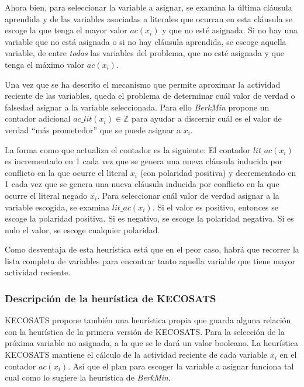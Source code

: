\documentclass[12pt,lettersize,oneside]{article}
\begin{document}
Ahora bien, para seleccionar la variable a asignar, se examina la última
cláusula aprendida y de las variables asociadas a literales que ocurran en esta
cláusula se escoge la que tenga el mayor valor $ac(x_i)$ y que no esté
asignada. Si no hay una variable que no está asignada o si no hay cláusula
aprendida, se escoge aquella variable, de entre \emph{todas} las variables del
problema, que no esté asignada y que tenga el máximo valor $ac(x_i)$.

Una vez que se ha descrito el mecanismo que permite aproximar la actividad
reciente de las variables, queda el problema de determinar cuál valor de verdad
o falsedad asignar a la variable seleccionada. Para ello \emph{BerkMin} propone
un contador adicional $ac\_lit(x_i) \in \mathbb{Z}$ para ayudar a discernir cuál
es el valor de verdad ``más prometedor'' que se puede asignar a $x_i$.

La forma como que actualiza el contador es la siguiente: El contador
$lit\_ac(x_i)$ es incrementado en 1 cada vez que se genera una nueva cláusula
inducida por conflicto en la que ocurre el literal $x_i$ (con polaridad
positiva) y decrementado en 1 cada vez que se genera una nueva cláusula inducida
por conflicto en la que ocurre el literal negado $\overline{x_i}$. Para
seleccionar cuál valor de verdad asignar a la variable escogida, se examina
$lit\_ac(x_i)$. Si el valor es positivo, entonces se escoge la polaridad
positiva. Si es negativo, se escoge la polaridad negativa. Si es nulo el valor,
se escoge cualquier polaridad.

Como desventaja de esta heurística está que en el peor caso, habrá que recorrer
la lista completa de variables para encontrar tanto aquella variable que tiene
mayor actividad reciente.





\subsubsection{Descripción de la heurística de KECOSATS}

KECOSATS propone también una heurística propia que guarda alguna relación con
la heurística de la primera versión de KECOSATS. Para la selección de la próxima
variable no asignada, a la que se le dará un valor booleano. La heurística
KECOSATS mantiene el cálculo de la actividad reciente de cada variable $x_i$ en
el contador $ac(x_i)$. Así que el plan para escoger la variable a asignar
funciona tal cual como lo sugiere la heurística de \emph{BerkMin}. 
\end{document}
